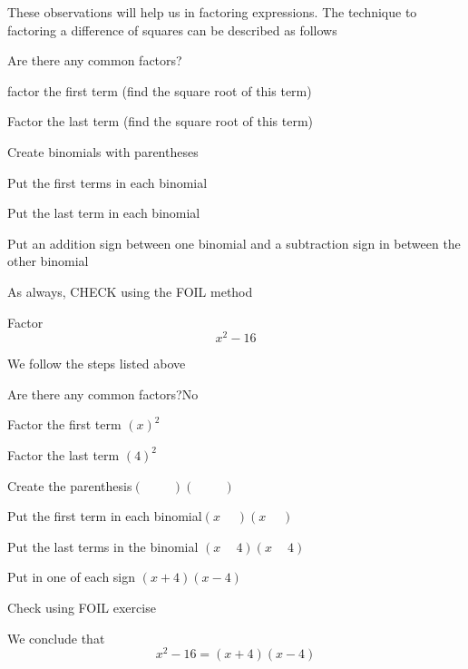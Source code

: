 These observations will help us in factoring expressions. The technique to factoring a difference of squares can
be described as follows
\begin{steps}
	\item Are there any common factors?
	\item \Gls{factor} the first term (find the square root of this term)
	\item Factor the last term (find the square root of this term)
	\item Create binomials with parentheses
	\item Put the first terms in each \gls{binomial}
	\item Put the last term in each binomial
	\item Put an addition sign between one binomial and a subtraction sign in between the other binomial
	\item As always, CHECK using the FOIL method
\end{steps} 
\label{list:stepsforfactoring}
\begin{myexample}\label{ex:factordiffsquares}
Factor
\[
	x^2-16
\]
{}
\end{myexample}
\begin{myProof}
	We follow the steps listed above
	\begin{steps}
		\item Are there any common factors?\hfill No
		\item	Factor the first term \hfill               $(x)^2$
		\item	Factor the last term  \hfill               $(4)^2$
		\item	Create the parenthesis\hfill               $(\phantom{x+4})(\phantom{x-4})$
		\item	Put the first term in each binomial\hfill  $(x\phantom{+4})(x\phantom{-4})$
		\item	Put the last terms in the binomial  \hfill $(x\phantom{+}4)(x\phantom{-}4)$
		\item	Put in one of each sign              \hfill $(x+4)(x-4)$
		\item	Check using FOIL                     \hfill exercise                     
	\end{steps}
	We conclude that 
	\[
		x^2-16 = (x+4)(x-4)
	\]
	{}
\end{myProof} 

